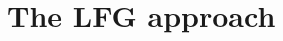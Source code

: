 \documentclass[output=paper,hidelinks]{langscibook}
\begin{document}



\section{The LFG approach}\label{sec:IS:2}
\end{document}
